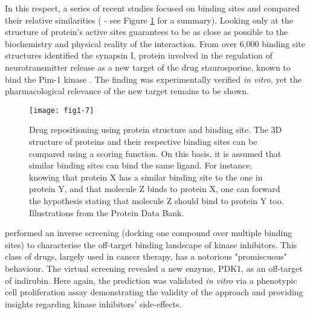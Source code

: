 In this respect, a series of recent studies focused on binding sites and compared their relative similarities (\cite{haupt2011old} - see Figure \ref{fig1-7} for a summary). Looking only at the structure of protein's active sites guarantees to be as close as possible to the biochemistry and physical reality of the interaction. From over 6,000 binding site structures \cite{de2010binding} identified the synapsin I, protein involved in the regulation of neurotransmitter release as a new target of the drug staurosporine, known to bind the Pim-1 kinase \citep{de2010binding}. The finding was experimentally verified \emph{in vitro}, yet the pharmacological relevance of the new target remains to be shown.

\begin{figure}[ht]
    \centering
    \texttt{[image: fig1-7]}
    \caption{Drug repositioning using protein structure and binding site. The 3D structure of proteins and their respective binding sites can be compared using a scoring function. On this basis, it is assumed that similar binding sites can bind the same ligand. For instance, knowing that protein X has a similar binding site to the one in protein Y, and that molecule Z binds to protein X, one can forward the hypothesis stating that molecule Z should bind to protein Y too. Illustrations from the Protein Data Bank.}
    \label{fig1-7}
\end{figure}

\cite{zahler2007inverse} performed an inverse screening (docking one compound over multiple binding sites) to characterise the off-target binding landscape of kinase inhibitors. This class of drugs, largely used in cancer therapy, has a notorious "promiscuous" behaviour. The virtual screening revealed a new enzyme, PDK1, as an off-target of indirubin. Here again, the prediction was validated \emph{in vitro} via a phenotypic cell proliferation assay demonstrating the validity of the approach and providing insights regarding kinase inhibitors' side-effects.

